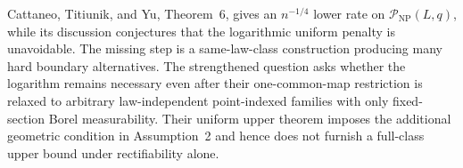 Cattaneo, Titiunik, and Yu, Theorem~6, gives an \(n^{-1/4}\) lower rate on \(\mathcal P_{\mathrm{NP}}(L,q)\), while its discussion conjectures that the logarithmic uniform penalty is unavoidable.  The missing step is a same-law-class construction producing many hard boundary alternatives.  The strengthened question asks whether the logarithm remains necessary even after their one-common-map restriction is relaxed to arbitrary law-independent point-indexed families with only fixed-section Borel measurability.  Their uniform upper theorem imposes the additional geometric condition in Assumption~2 and hence does not furnish a full-class upper bound under rectifiability alone.